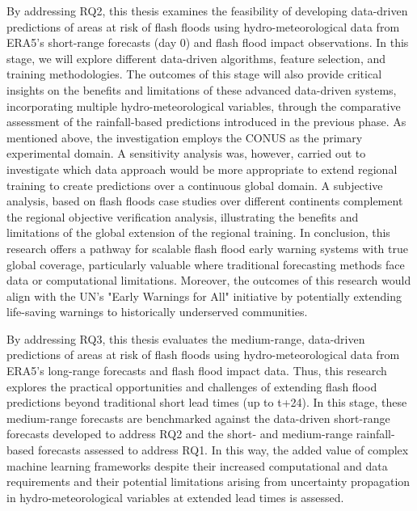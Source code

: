 By addressing RQ2, this thesis examines the feasibility of developing data-driven predictions of areas at risk of flash floods using hydro-meteorological data from ERA5's short-range forecasts (day 0) and flash flood impact observations. In this stage, we will explore different data-driven algorithms, feature selection, and training methodologies. The outcomes of this stage will also provide critical insights on the benefits and limitations of these advanced data-driven systems, incorporating multiple hydro-meteorological variables, through the comparative assessment of the rainfall-based predictions introduced in the previous phase. As mentioned above, the investigation employs the CONUS as the primary experimental domain. A sensitivity analysis was, however, carried out to investigate which data approach would be more appropriate to extend regional training to create predictions over a continuous global domain. A subjective analysis, based on flash floods case studies over different continents complement the regional objective verification analysis, illustrating the benefits and limitations of the global extension of the regional training. In conclusion, this research offers a pathway for scalable flash flood early warning systems with true global coverage, particularly valuable where traditional forecasting methods face data or computational limitations. Moreover, the outcomes of this research would align with the UN's "Early Warnings for All" initiative by potentially extending life-saving warnings to historically underserved communities.

By addressing RQ3, this thesis evaluates the medium-range, data-driven predictions of areas at risk of flash floods using hydro-meteorological data from ERA5's long-range forecasts and flash flood impact data. Thus, this research explores the practical opportunities and challenges of extending flash flood predictions beyond traditional short lead times (up to t+24). In this stage, these medium-range forecasts are benchmarked against the data-driven short-range forecasts developed to address RQ2 and the short- and medium-range rainfall-based forecasts assessed to address RQ1. In this way, the added value of complex machine learning frameworks despite their increased computational and data requirements and their potential limitations arising from uncertainty propagation in hydro-meteorological variables at extended lead times is assessed.



























